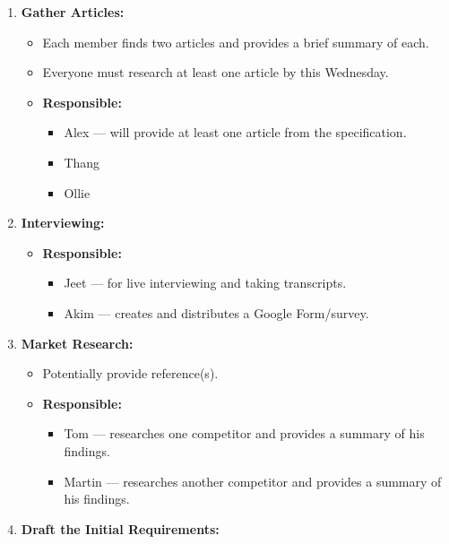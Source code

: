 \documentclass[12pt]{article}
\begin{document}
\begin{enumerate}
\def\labelenumi{\arabic{enumi}.}
\tightlist
\item
  \textbf{Gather Articles:}

  \begin{itemize}
  \tightlist
  \item
    Each member finds two articles and provides a brief summary of each.
  \item
    Everyone must research at least one article by this Wednesday.
  \item
    \textbf{Responsible:}

    \begin{itemize}
    \tightlist
    \item
      Alex --- will provide at least one article from the specification.
    \item
      Thang
    \item
      Ollie
    \end{itemize}
  \end{itemize}
\item
  \textbf{Interviewing:}

  \begin{itemize}
  \tightlist
  \item
    \textbf{Responsible:}

    \begin{itemize}
    \tightlist
    \item
      Jeet --- for live interviewing and taking transcripts.
    \item
      Akim --- creates and distributes a Google Form/survey.
    \end{itemize}
  \end{itemize}
\item
  \textbf{Market Research:}

  \begin{itemize}
  \tightlist
  \item
    Potentially provide reference(s).
  \item
    \textbf{Responsible:}

    \begin{itemize}
    \tightlist
    \item
      Tom --- researches one competitor and provides a summary of his
      findings.
    \item
      Martin --- researches another competitor and provides a summary of
      his findings.
    \end{itemize}
  \end{itemize}
  \newpage
\item
  \textbf{Draft the Initial Requirements:}


\end{enumerate}
\end{document}

